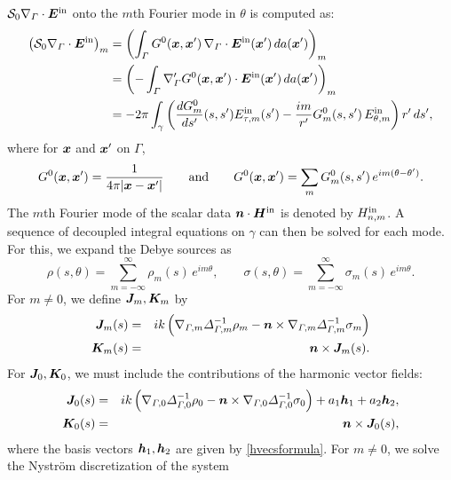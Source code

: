 \documentclass[11pt]{article}
\newcommand{\vct}{\vectorsym}
\newcommand{\surfdiv}{\nabla_\Gamma \cdot}
\newcommand{\surfgrad}{\nabla_\Gamma}
\newcommand{\surflapm}{\Delta_{\Gamma,m}}
\newcommand{\bn}{\vct{ n}}
\newcommand{\bx}{\vct{ x}}
\newcommand{\bJ}{\vct{ J}}
\newcommand{\bK}{\vct{ K}}
\newcommand{\cS}{\mathcal S}
\newcommand\nhat{\vct{ {n}}}
\newcommand\bh{\vct{h}}
\newcommand\bEin{\vct{E}^\textnormal{in}}
\newcommand\bHin{\vct{H}^\textnormal{in}}
\newcommand\Ein{E^\textnormal{in}}
\newcommand\Hin{H^\textnormal{in}}
\numberwithin{equation}{section}
\begin{document}
$\cS_0 \surfdiv \bEin$ onto the $m$th Fourier mode in $\theta$
is computed as:
\begin{equation}
  \begin{aligned}
    \left( \cS_0 \surfdiv \bEin \right)_m &=
    \left(  \int_\Gamma G^0(\bx,\bx') \, \surfdiv \bEin(\bx') \, da(\bx')
    \right)_m \\
    &= \left(  -\int_\Gamma \surfgrad' G^0(\bx,\bx') \cdot
      \bEin(\bx') \, da(\bx') \right)_m \\
    &= -2\pi \int_\gamma \left( \frac{dG^0_m}{ds'}(s,s') \Ein_{\tau,m}(s') -
      \frac{im}{r'} G^0_m(s,s') \, \Ein_{\theta,m} \right) r' \, ds',
  \end{aligned}
\end{equation}
where for $\bx$ and $\bx'$ on $\Gamma$,
\begin{equation}
  G^0(\bx,\bx') = \frac{1}{4\pi |\bx-\bx'|} \qquad\text{and} \qquad
  G^0(\bx,\bx') = \sum_m G^0_m(s,s') \, e^{im(\theta-\theta')}.
\end{equation}
The $m$th Fourier mode of the scalar data $\bn \cdot \bHin$ is denoted by
$\Hin_{n,m}$. A sequence of decoupled integral equations on $\gamma$
can then be solved for each mode.
For this, we expand the Debye sources as
\begin{equation}\label{sourceexp}
\rho(s,\theta) = \sum_{m=-\infty}^{\infty} \rho_m(s) \,
e^{im\theta}, \qquad 
\sigma(s,\theta) = \sum_{m=-\infty}^{\infty} \sigma_m(s) \,
e^{im\theta}.
\end{equation}
For $m \neq 0$, we define $\bJ_m,\bK_m$ by 
\begin{eqnarray*}
\bJ_m(s) &=& ik \left(  \nabla_{\Gamma,m}  \surflapm^{-1} \rho_m -
 \nhat \times \nabla_{\Gamma,m}  \surflapm^{-1} \sigma_m \right) \\
\bK_m(s) &=& \nhat \times \bJ_m(s).
\end{eqnarray*}
For $\bJ_0,\bK_0$, we must include the contributions of the harmonic vector
fields:
\begin{eqnarray*}
\bJ_0(s) &=& ik \left(  \nabla_{\Gamma,0}  \Delta_{\Gamma,0}^{-1} \rho_0 -
 \nhat \times \nabla_{\Gamma,0}  \Delta_{\Gamma,0}^{-1} \sigma_0 \right) +
a_1 \bh_1 + a_2 \bh_2, \\
\bK_0(s) &=& \nhat \times \bJ_0(s),
\end{eqnarray*}
where the basis vectors $\bh_1,\bh_2$ are given by
\eqref{hvecsformula}.
For $m \neq 0$, we solve the Nystr\"om discretization of the
system
\end{document}
